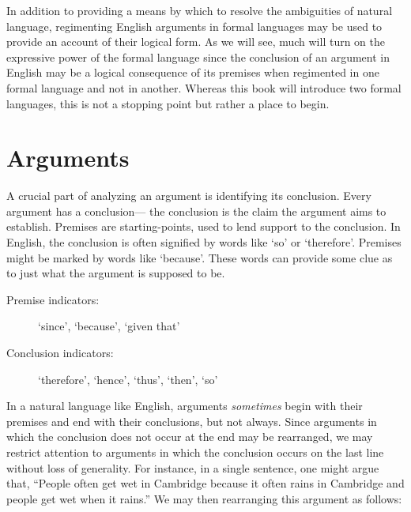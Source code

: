 In addition to providing a means by which to resolve the ambiguities of natural language, regimenting English arguments in formal languages may be used to provide an account of their logical form.
As we will see, much will turn on the expressive power of the formal language since the conclusion of an argument in English may be a logical consequence of its premises when regimented in one formal language and not in another.
Whereas this book will introduce two formal languages, this is not a stopping point but rather a place to begin.






\section{Arguments}

A crucial part of analyzing an argument is identifying its conclusion.
Every argument has a conclusion--- the conclusion is the claim the argument aims to establish.
Premises are starting-points, used to lend support to the conclusion.
In English, the conclusion is often signified by words like `so' or `therefore'.
Premises might be marked by words like `because'.
These words can provide some clue as to just what the argument is supposed to be.

\begin{description}
  \item[Premise indicators:] `since', `because', `given that'
  \item[Conclusion indicators:] `therefore', `hence', `thus', `then', `so'
\end{description}

In a natural language like English, arguments \textit{sometimes} begin with their premises and end with their conclusions, but not always.
Since arguments in which the conclusion does not occur at the end may be rearranged, we may restrict attention to arguments in which the conclusion occurs on the last line without loss of generality.
For instance, in a single sentence, one might argue that, ``People often get wet in Cambridge because it often rains in Cambridge and people get wet when it rains.''
We may then rearranging this argument as follows:

